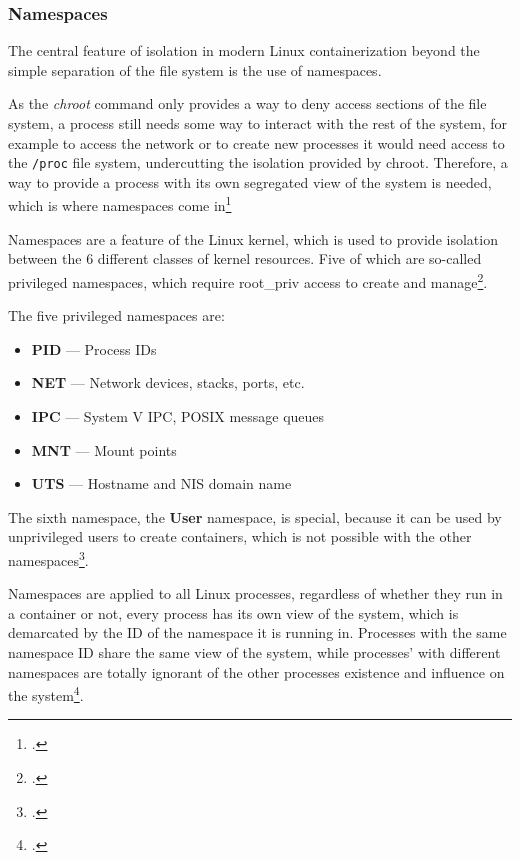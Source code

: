 \subsubsection{Namespaces}

The central feature of isolation in modern Linux containerization beyond the simple separation of the file system is the use of namespaces.

As the \textit{chroot} command only provides a way to deny access sections of the file system, a process still needs some way to interact with the rest of the system,
for example to access the network or to create new processes it would need access to the \texttt{/proc} file system, undercutting the isolation provided by chroot.
Therefore, a way to provide a process with its own segregated view of the system is needed, which is where namespaces come in\footcite{datadogContainerSecurityFundamentals2023}

Namespaces are a feature of the Linux kernel, which is used to provide isolation between the 6 different classes of kernel resources.
Five of which are so-called privileged namespaces, which require \gls{root_priv} access to create and manage\footcite{217614}.

\pagebreak

The five privileged namespaces are:
\begin{itemize}
    \item \textbf{PID} — Process IDs
    \item \textbf{NET} — Network devices, stacks, ports, etc.
    \item \textbf{IPC} — System V IPC, POSIX message queues
    \item \textbf{MNT} — Mount points
    \item \textbf{UTS} — Hostname and NIS domain name
\end{itemize}

The sixth namespace, the \textbf{User} namespace, is special,
because it can be used by unprivileged users to create containers,
which is not possible with the other namespaces\footcite{priedhorskyCharliecloudUnprivilegedContainers2017}.

Namespaces are applied to all Linux processes, regardless of whether they run in a container or not,
every process has its own view of the system, which is demarcated by the ID of the namespace it is running in.
Processes with the same namespace ID share the same view of the system,
while processes' with different namespaces are totally ignorant of the other processes existence and influence on the system\footcite{michaelkerriskNamespacesOperationPart2013}.


